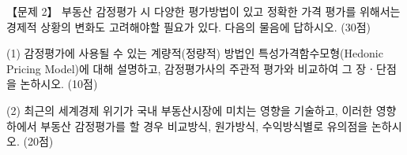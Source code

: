 \begin{longquestion}{【문제 2】}
부동산 감정평가 시 다양한 평가방법이 있고 정확한 가격 평가를 위해서는 경제적 상황의 변화도 고려해야할 필요가 있다. 다음의 물음에 답하시오. (30점) \par
\medskip\noindent (1) 감정평가에 사용될 수 있는 계량적(정량적) 방법인 특성가격함수모형(Hedonic Pricing Model)에 대해 설명하고, 감정평가사의 주관적 평가와 비교하여 그 장ㆍ단점을 논하시오. (10점) \par
\medskip\noindent (2) 최근의 세계경제 위기가 국내 부동산시장에 미치는 영향을 기술하고, 이러한 영향 하에서 부동산 감정평가를 할 경우 비교방식, 원가방식, 수익방식별로 유의점을 논하시오. (20점) \par
\end{longquestion}
